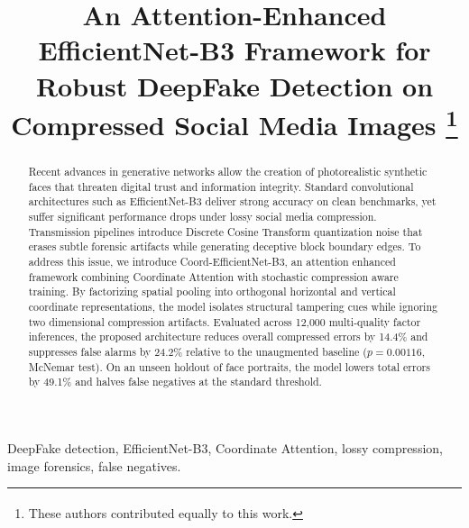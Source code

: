 \documentclass[conference]{IEEEtran}
\begin{document}
\title{An Attention-Enhanced EfficientNet-B3 Framework for Robust DeepFake Detection on Compressed Social Media Images
\thanks{\textsuperscript{\dag}These authors contributed equally to this work.}
}

\author{
}

\maketitle

\begin{abstract}
Recent advances in generative networks allow the creation of photorealistic synthetic faces that threaten digital trust and information integrity. Standard convolutional architectures such as EfficientNet-B3 deliver strong accuracy on clean benchmarks, yet suffer significant performance drops under lossy social media compression. Transmission pipelines introduce Discrete Cosine Transform quantization noise that erases subtle forensic artifacts while generating deceptive block boundary edges. To address this issue, we introduce Coord-EfficientNet-B3, an attention enhanced framework combining Coordinate Attention with stochastic compression aware training. By factorizing spatial pooling into orthogonal horizontal and vertical coordinate representations, the model isolates structural tampering cues while ignoring two dimensional compression artifacts. Evaluated across 12,000 multi-quality factor inferences, the proposed architecture reduces overall compressed errors by 14.4\% and suppresses false alarms by 24.2\% relative to the unaugmented baseline ($p = 0.00116$, McNemar test). On an unseen holdout of face portraits, the model lowers total errors by 49.1\% and halves false negatives at the standard threshold.
\end{abstract}

\begin{IEEEkeywords}
DeepFake detection, EfficientNet-B3, Coordinate Attention, lossy compression, image forensics, false negatives.
\end{IEEEkeywords}
\end{document}
